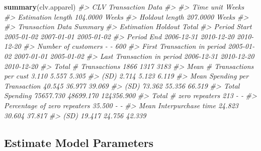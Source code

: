 \documentclass[
]{article}
\newenvironment{Shaded}{\begin{snugshade}}{\end{snugshade}}
\newcommand{\CommentTok}[1]{\textcolor[rgb]{0.56,0.35,0.01}{\textit{#1}}}
\newcommand{\FunctionTok}[1]{\textcolor[rgb]{0.13,0.29,0.53}{\textbf{#1}}}
\newcommand{\NormalTok}[1]{#1}
\begin{document}
\begin{Shaded}
\begin{Highlighting}[]
\FunctionTok{summary}\NormalTok{(clv.apparel)}
\CommentTok{\#\textgreater{} CLV Transaction Data }
\CommentTok{\#\textgreater{}                                 }
\CommentTok{\#\textgreater{} Time unit         Weeks         }
\CommentTok{\#\textgreater{} Estimation length 104.0000 Weeks}
\CommentTok{\#\textgreater{} Holdout length    207.0000 Weeks}
\CommentTok{\#\textgreater{} }
\CommentTok{\#\textgreater{} Transaction Data Summary }
\CommentTok{\#\textgreater{}                                    Estimation      Holdout         Total     }
\CommentTok{\#\textgreater{} Period Start                       2005{-}01{-}02      2007{-}01{-}01      2005{-}01{-}02}
\CommentTok{\#\textgreater{} Period End                         2006{-}12{-}31      2010{-}12{-}20      2010{-}12{-}20}
\CommentTok{\#\textgreater{} Number of customers                {-}               {-}               600       }
\CommentTok{\#\textgreater{} First Transaction in period        2005{-}01{-}02      2007{-}01{-}01      2005{-}01{-}02}
\CommentTok{\#\textgreater{} Last Transaction in period         2006{-}12{-}31      2010{-}12{-}20      2010{-}12{-}20}
\CommentTok{\#\textgreater{} Total \# Transactions               1866            1317            3183      }
\CommentTok{\#\textgreater{} Mean \# Transactions per cust       3.110           5.557           5.305     }
\CommentTok{\#\textgreater{} (SD)                               2.714           5.123           6.119     }
\CommentTok{\#\textgreater{} Mean Spending per Transaction      40.545          36.977          39.069    }
\CommentTok{\#\textgreater{} (SD)                               73.362          55.356          66.519    }
\CommentTok{\#\textgreater{} Total Spending                     75657.730       48699.170       124356.900}
\CommentTok{\#\textgreater{} Total \# zero repeaters             213             {-}               {-}         }
\CommentTok{\#\textgreater{} Percentage of zero repeaters       35.500          {-}               {-}         }
\CommentTok{\#\textgreater{} Mean Interpurchase time            24.823          30.604          37.817    }
\CommentTok{\#\textgreater{} (SD)                               19.417          24.756          42.339}
\end{Highlighting}
\end{Shaded}

\subsection{Estimate Model Parameters}\label{estimate}
\end{document}
